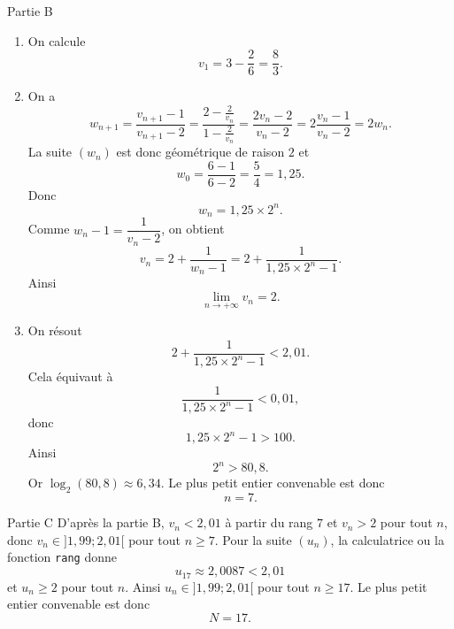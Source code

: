 \documentclass[11pt,a4paper]{article}
\begin{document}
\begin{correctionbox}{Partie B}
\begin{enumerate}
\item On calcule
\[
v_1=3-\dfrac2{6}=\dfrac83.
\]

\item On a
\[
w_{n+1}=\dfrac{v_{n+1}-1}{v_{n+1}-2}
=\dfrac{2-\frac2{v_n}}{1-\frac2{v_n}}
=\dfrac{2v_n-2}{v_n-2}
=2\dfrac{v_n-1}{v_n-2}=2w_n.
\]
La suite $(w_n)$ est donc géométrique de raison $2$ et
\[
w_0=\dfrac{6-1}{6-2}=\dfrac54=1{,}25.
\]
Donc
\[
w_n=1{,}25\times2^n.
\]
Comme $w_n-1=\dfrac1{v_n-2}$, on obtient
\[
v_n=2+\dfrac1{w_n-1}=2+\dfrac{1}{1{,}25\times2^n-1}.
\]
Ainsi
\[
\lim_{n\to+\infty}v_n=2.
\]

\item On résout
\[
2+\dfrac{1}{1{,}25\times2^n-1}<2{,}01.
\]
Cela équivaut à
\[
\dfrac{1}{1{,}25\times2^n-1}<0{,}01,
\]
donc
\[
1{,}25\times2^n-1>100.
\]
Ainsi
\[
2^n>80{,}8.
\]
Or $\log_2(80{,}8)\approx6{,}34$. Le plus petit entier convenable est donc
\[
\boxed{n=7}.
\]
\end{enumerate}
\end{correctionbox}

\begin{correctionbox}{Partie C}
D'après la partie B, $v_n<2{,}01$ à partir du rang $7$ et $v_n>2$ pour tout $n$, donc $v_n\in]1{,}99;2{,}01[$ pour tout $n\geqslant7$.
Pour la suite $(u_n)$, la calculatrice ou la fonction \texttt{rang} donne
\[
u_{17}\approx2{,}0087<2{,}01
\]
et $u_n\geqslant2$ pour tout $n$. Ainsi $u_n\in]1{,}99;2{,}01[$ pour tout $n\geqslant17$.
Le plus petit entier convenable est donc
\[
\boxed{N=17}.
\]
\end{correctionbox}
\end{document}
